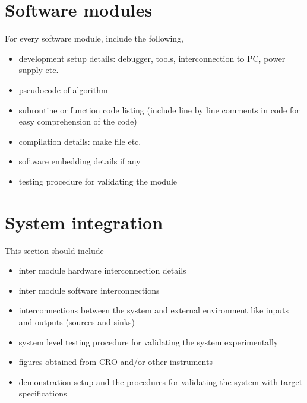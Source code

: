 \section{Software modules}

For every software module, include the following,
\begin{itemize}
\item development setup details: debugger, tools, interconnection to PC,
power supply etc.
\item pseudocode of algorithm
\item subroutine or function code listing (include line by line comments
in code for easy comprehension of the code)
\item compilation details: make file etc.
\item software embedding details if any
\item testing procedure for validating the module
\end{itemize}

\section{System integration}

This section should include 
\begin{itemize}
\item inter module hardware interconnection details
\item inter module software interconnections
\item interconnections between the system and external environment like
inputs and outputs (sources and sinks)
\item system level testing procedure for validating the system experimentally
\item figures obtained from CRO and/or other instruments
\item demonstration setup and the procedures for validating the system with
target specifications
\end{itemize}

